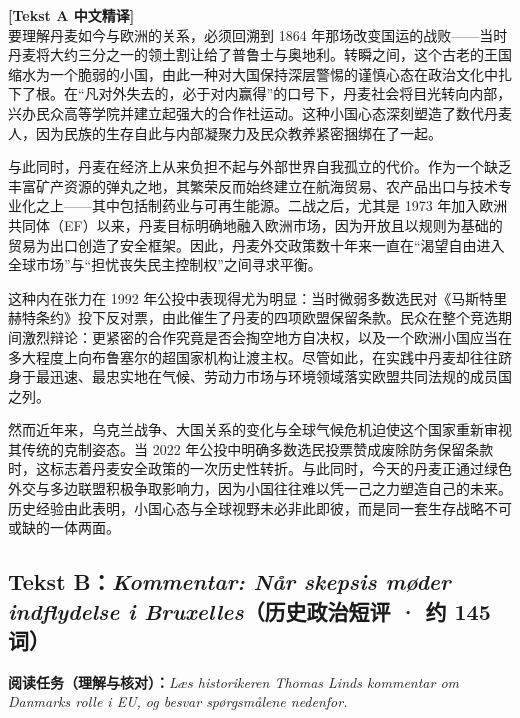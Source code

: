\begin{transbox}
\small
\textbf{\color{NCDTeal}[Tekst A 中文精译]}\\
要理解丹麦如今与欧洲的关系，必须回溯到 1864 年那场改变国运的战败——当时丹麦将大约三分之一的领土割让给了普鲁士与奥地利。转瞬之间，这个古老的王国缩水为一个脆弱的小国，由此一种对大国保持深层警惕的谨慎心态在政治文化中扎下了根。在“凡对外失去的，必于对内赢得”的口号下，丹麦社会将目光转向内部，兴办民众高等学院并建立起强大的合作社运动。这种小国心态深刻塑造了数代丹麦人，因为民族的生存自此与内部凝聚力及民众教养紧密捆绑在了一起。

与此同时，丹麦在经济上从来负担不起与外部世界自我孤立的代价。作为一个缺乏丰富矿产资源的弹丸之地，其繁荣反而始终建立在航海贸易、农产品出口与技术专业化之上——其中包括制药业与可再生能源。二战之后，尤其是 1973 年加入欧洲共同体（EF）以来，丹麦目标明确地融入欧洲市场，因为开放且以规则为基础的贸易为出口创造了安全框架。因此，丹麦外交政策数十年来一直在“渴望自由进入全球市场”与“担忧丧失民主控制权”之间寻求平衡。

这种内在张力在 1992 年公投中表现得尤为明显：当时微弱多数选民对《马斯特里赫特条约》投下反对票，由此催生了丹麦的四项欧盟保留条款。民众在整个竞选期间激烈辩论：更紧密的合作究竟是否会掏空地方自决权，以及一个欧洲小国应当在多大程度上向布鲁塞尔的超国家机构让渡主权。尽管如此，在实践中丹麦却往往跻身于最迅速、最忠实地在气候、劳动力市场与环境领域落实欧盟共同法规的成员国之列。

然而近年来，乌克兰战争、大国关系的变化与全球气候危机迫使这个国家重新审视其传统的克制姿态。当 2022 年公投中明确多数选民投票赞成废除防务保留条款时，这标志着丹麦安全政策的一次历史性转折。与此同时，今天的丹麦正通过绿色外交与多边联盟积极争取影响力，因为小国往往难以凭一己之力塑造自己的未来。历史经验由此表明，小国心态与全球视野未必非此即彼，而是同一套生存战略不可或缺的一体两面。
\end{transbox}

\subsection*{Tekst B：\textit{Kommentar: Når skepsis møder indflydelse i Bruxelles}（历史政治短评 · 约 145 词）}

\textbf{阅读任务（理解与核对）：}\textit{Læs historikeren Thomas Linds kommentar om Danmarks rolle i EU, og besvar spørgsmålene nedenfor.}


